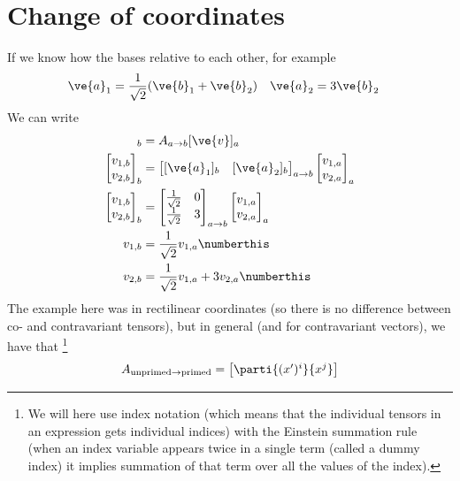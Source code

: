 \documentclass[a4paper, 12pt]{article}
\begin{document}
\section{Change of coordinates} \label{sec:change_of_coordinates}
If we know how the bases relative to each other, for example
%
\begin{align}
 &\ve{a}_1=\frac{1}{\sqrt{2}}(\ve{b}_1 + \ve{b}_2)&
 &\ve{a}_2=3\ve{b}_2
 \label{eq:eq_with_basis_vector}
\end{align}
%
We can write
%
\begin{align*}
 [\ve{v}]_b &= A_{a\to b}[\ve{v}]_a\\
 \begin{bmatrix}
  v_{1,b}\\
  v_{2,b}
 \end{bmatrix}_b
 &=
  \begin{bmatrix}
  [\ve{a}_1]_b & [\ve{a}_2]_b
 \end{bmatrix}_{a\to b}
   \begin{bmatrix}
  v_{1,a}\\
  v_{2,a}
 \end{bmatrix}_a\\
 \begin{bmatrix}
  v_{1,b}\\
  v_{2,b}
 \end{bmatrix}_b
 &=
  \begin{bmatrix}
  \frac{1}{\sqrt{2}} & 0\\
  \frac{1}{\sqrt{2}} & 3
 \end{bmatrix}_{a\to b}
   \begin{bmatrix}
  v_{1,a}\\
  v_{2,a}
 \end{bmatrix}_a\\
 v_{1,b} &= \frac{1}{\sqrt{2}}v_{1,a}
 \numberthis \label{eq:coord_v1b}\\
 v_{2,b} &= \frac{1}{\sqrt{2}}v_{1,a} + 3v_{2,a} 
 \numberthis \label{eq:coord_v2b}
\end{align*}
%
The example here was in rectilinear coordinates (so there is no difference 
between co- and contravariant tensors), but in general (and for contravariant 
vectors), we have that%
\footnote{We will here use index notation (which means that the individual 
tensors in an expression gets individual indices) with the Einstein summation 
rule (when an index variable appears twice in a single term (called a dummy 
index) it implies summation of that term over all the values of the index).}
%
\begin{align}
 A_{\text{unprimed}\to \text{primed}}
 =
 \begin{bmatrix}
  \parti{(x')^i}{x^j}
 \end{bmatrix}
 \label{eq:contravariant_matrix}
\end{align}
\end{document}
